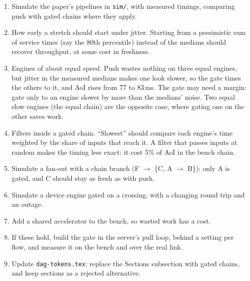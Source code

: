 \documentclass[11pt]{article}
\newcommand{\code}[1]{\texttt{#1}}
\begin{document}
\begin{enumerate}[nosep]
  \item Simulate the paper's pipelines in \code{sim/}, with measured
        timings, comparing push with gated chains where they apply.
  \item How early a stretch should start under jitter. Starting from a
        pessimistic sum of service times (say the 80th percentile) instead
        of the medians should recover throughput, at some cost in freshness.
  \item Engines of about equal speed. Push wastes nothing on three equal
        engines, but jitter in the measured medians makes one look slower,
        so the gate times the others to it, and AoI rises from 77 to
        83\,ms. The gate may need a margin: gate only to an engine slower
        by more than the medians' noise. Two equal slow engines (the equal
        chain) are the opposite case, where gating one on the other saves
        work.
  \item Filters inside a gated chain. ``Slowest'' should compare each
        engine's time weighted by the share of inputs that reach it. A
        filter that passes inputs at random makes the timing less exact:
        it cost 5\% of AoI in the bench chain.
  \item Simulate a fan-out with a chain branch (F $\to$ \{C, A $\to$ B\}):
        only A is gated, and C should stay as fresh as with push.
  \item Simulate a device engine gated on a crossing, with a changing round
        trip and an outage.
  \item Add a shared accelerator to the bench, so wasted work has a cost.
  \item If these hold, build the gate in the server's pull loop, behind a
        setting per flow, and measure it on the bench and over the real
        link.
  \item Update \code{dag-tokens.tex}: replace the Sections subsection with
        gated chains, and keep sections as a rejected alternative.
\end{enumerate}
\end{document}
